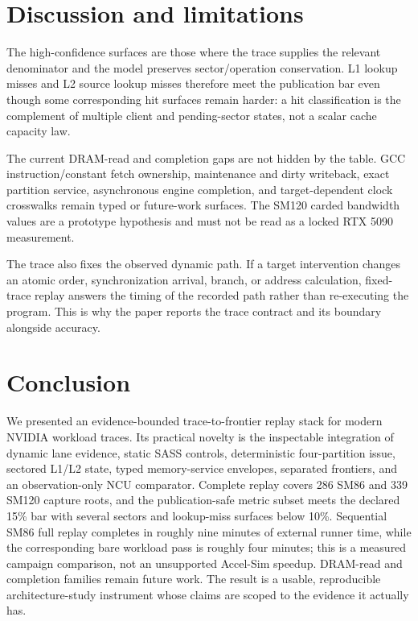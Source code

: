\documentclass[10pt,letterpaper]{article}
\begin{document}
\section{Discussion and limitations}
\label{sec:limitations}

The high-confidence surfaces are those where the trace supplies the relevant
denominator and the model preserves sector/operation conservation.  L1 lookup
misses and L2 source lookup misses therefore meet the publication bar even
though some corresponding hit surfaces remain harder: a hit classification is
the complement of multiple client and pending-sector states, not a scalar cache
capacity law.

The current DRAM-read and completion gaps are not hidden by the table.  GCC
instruction/constant fetch ownership, maintenance and dirty writeback, exact
partition service, asynchronous engine completion, and target-dependent clock
crosswalks remain typed or future-work surfaces.  The SM120 carded bandwidth
values are a prototype hypothesis and must not be read as a locked RTX 5090
measurement.

The trace also fixes the observed dynamic path.  If a target intervention
changes an atomic order, synchronization arrival, branch, or address
calculation, fixed-trace replay answers the timing of the recorded path rather
than re-executing the program.  This is why the paper reports the trace
contract and its boundary alongside accuracy.

\section{Conclusion}
\label{sec:conclusion}

We presented an evidence-bounded trace-to-frontier replay stack for modern
NVIDIA workload traces.  Its practical novelty is the inspectable integration
of dynamic lane evidence, static SASS controls, deterministic four-partition
issue, sectored L1/L2 state, typed memory-service envelopes, separated
frontiers, and an observation-only NCU comparator.  Complete replay covers 286
SM86 and 339 SM120 capture roots, and the publication-safe metric subset meets
the declared 15\% bar with several sectors and lookup-miss surfaces below 10\%.
Sequential SM86 full replay completes in roughly nine minutes of external
runner time, while the corresponding bare workload pass is roughly four
minutes; this is a measured campaign comparison, not an unsupported
Accel-Sim speedup.  DRAM-read and completion families remain future work.  The
result is a usable, reproducible architecture-study instrument whose claims
are scoped to the evidence it actually has.



\end{document}
